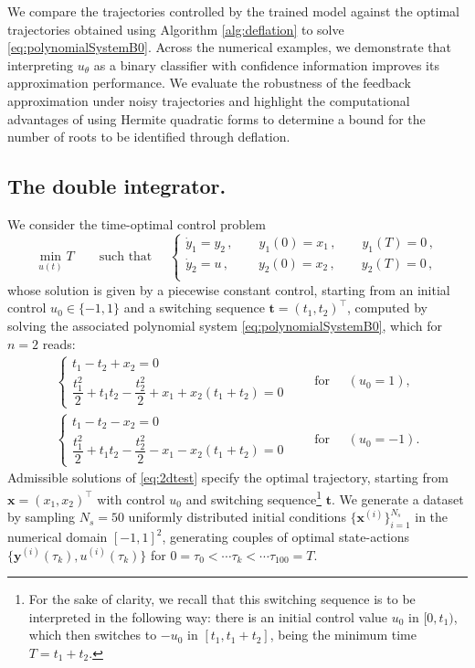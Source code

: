 \documentclass[11pt]{amsart}
\theoremstyle{definition}
\theoremstyle{remark}
\numberwithin{equation}{section}
\begin{document}
We compare the trajectories controlled by the trained model against the optimal trajectories obtained using Algorithm \ref{alg:deflation} to solve \eqref{eq:polynomialSystemB0}. Across the numerical examples, we demonstrate that interpreting $u_\theta$ as a binary classifier with confidence information improves its approximation performance. 
We evaluate the robustness of the feedback approximation under noisy trajectories and highlight the computational advantages of using Hermite quadratic forms to determine a bound for the number of roots to be identified through deflation.
\subsection{The double integrator.}
We consider the time-optimal control problem 
\begin{equation*}
 \min\limits_{u(t)} T\qquad \text{such that }\quad\begin{cases}
 \dot{y}_1 = y_2\,,\qquad y_1(0) = x_1\,,\qquad {y}_1(T) = 0\,,\\
 \dot{y}_2 = u\,,\qquad\; y_2(0) = x_2\,,\qquad {y}_2(T) = 0\,,\\
 \end{cases}
\end{equation*}
whose solution is given by a piecewise constant control, starting from an initial control $u_0 \in \{-1,1\}$ and a switching sequence $\bm{t}= (t_1,t_2)^\top$, computed by solving the associated polynomial system \eqref{eq:polynomialSystemB0}, which for $n=2$ reads:
\begin{equation}\label{eq:2dtest}
\begin{aligned}
 \begin{cases}
 t_1 - t_2 + x_{2} = 0\\
\dfrac{t_1^2}{2} + t_1 t_2 - \dfrac{t_2^2}{2} + x_{1} + x_{2}(t_1+t_2) = 0
 \end{cases}\qquad \text{for }\; &(u_0=1),\\
 \begin{cases}
 t_1 - t_2 - x_{2} = 0\\
\dfrac{t_1^2}{2} + t_1 t_2 - \dfrac{t_2^2}{2} - x_{1} - x_{2}(t_1+t_2) = 0
 \end{cases}\qquad \text{for }\; &(u_0=-1).
 \end{aligned}
\end{equation}
Admissible solutions of \eqref{eq:2dtest} specify the optimal trajectory, starting from $\bm{x}=(x_1,x_2)^{\top}$ with control $u_0$ and switching sequence\footnote{For the sake of clarity, we recall that this switching sequence is to be interpreted in the following way: there is an initial control value $u_0$ in $[0,t_1)$, which then switches to $-u_0$ in $[t_1,t_1+t_2]$, being the minimum time $T=t_1+t_2$.} $\bm{t}$. We generate a dataset by sampling $N_s = 50$ uniformly distributed initial conditions $\bigl\{\bm{x}^{(i)}\bigr\}_{i=1}^{N_s}$ in the numerical domain $[-1,1]^2$, generating couples of optimal state-actions $\bigl\{\bm{y}^{(i)}(\tau_k),u^{(i)}(\tau_k)\bigr\}$ for $0 = \tau_0 < \cdots \tau_k < \cdots \tau_{100}= T $. 
\end{document}
